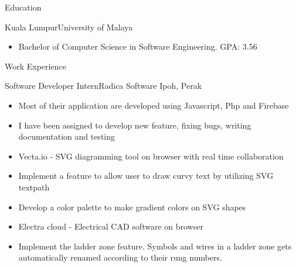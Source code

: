 \documentclass[]{mcdowellcv}
\begin{document}
\makeheader


\begin{cvsection}{Education}
	\begin{cvsubsection}{Kuala Lumpur}{University of Malaya}{}
		\begin{itemize}
			\item Bachelor of Computer Science in Software Engineering. GPA: 3.56
		\end{itemize}
	\end{cvsubsection}
\end{cvsection}
\begin{cvsection}{Work Experience}
	\begin{cvsubsection}{Software Developer Intern}{Radica Software}{}
		Ipoh, Perak
		\begin{itemize}%
			\item Most of their application are developed using Javascript, Php and Firebase
			\item I have been assigned to develop new feature, fixing bugs, writing documentation and testing
			\item Vecta.io - SVG diagramming tool on browser with real time collaboration
			\item Implement a feature to allow user to draw curvy text by utilizing SVG textpath
			\item Develop a color palette to make gradient colors on SVG shapes
			\item Electra cloud - Electrical CAD software on browser
			\item Implement the ladder zone feature. Symbols and wires in a ladder zone gets automatically renamed according to their rung numbers.
		\end{itemize}
	\end{cvsubsection}
\end{cvsection}
\end{document}
